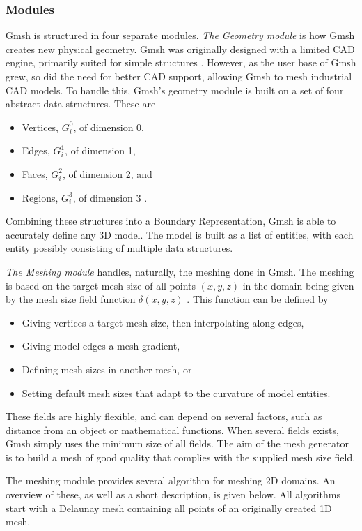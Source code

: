 \subsubsection{Modules}
Gmsh is structured in four separate modules. \emph{The Geometry module} is how Gmsh creates new physical geometry. Gmsh was originally designed with a limited CAD engine, primarily suited for simple structures \cite{Gmsh_article}. However, as the user base of Gmsh grew, so did the need for better CAD support, allowing Gmsh to mesh industrial CAD models. To handle this, Gmsh's geometry module is built on a set of four abstract data structures. These are
\begin{itemize}
    \item Vertices, $G_i^0$, of dimension 0,
    \item Edges, $G_i^1$, of dimension 1,
    \item Faces, $G_i^2$, of dimension 2, and
    \item Regions, $G_i^3$, of dimension 3 \cite{Gmsh_article}.
\end{itemize}
Combining these structures into a Boundary Representation, Gmsh is able to accurately define any 3D model. The model is built as a list of entities, with each entity possibly consisting of multiple data structures.

\emph{The Meshing module} handles, naturally, the meshing done in Gmsh. The meshing is based on the target mesh size of all points $(x, y, z)$ in the domain being given by the mesh size field function $\delta(x, y, z)$ \cite{Gmsh_article}. This function can be defined by
\begin{itemize}
    \item Giving vertices a target mesh size, then interpolating along edges,
    \item Giving model edges a mesh gradient,
    \item Defining mesh sizes in another mesh, or
    \item Setting default mesh sizes that adapt to the curvature of model entities.
\end{itemize}
These fields are highly flexible, and can depend on several factors, such as distance from an object or mathematical functions. When several fields exists, Gmsh simply uses the minimum size of all fields. The aim of the mesh generator is to build a mesh of good quality that complies with the supplied mesh size field.

The meshing module provides several algorithm for meshing 2D domains. An overview of these, as well as a short description, is given below. All algorithms start with a Delaunay mesh containing all points of an originally created 1D mesh.

